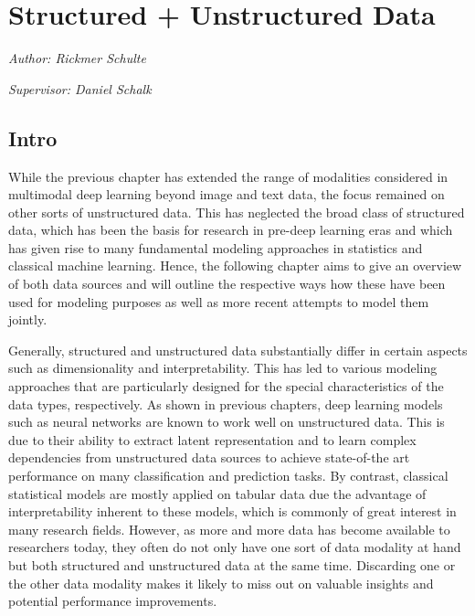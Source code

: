 \documentclass[
]{krantz}
\begin{document}
\hypertarget{c03-02-structured-unstructured}{%
\section{Structured + Unstructured Data}\label{c03-02-structured-unstructured}}

\emph{Author: Rickmer Schulte}

\emph{Supervisor: Daniel Schalk}

\hypertarget{intro-1}{%
\subsection{Intro}\label{intro-1}}

While the previous chapter has extended the range of modalities considered in multimodal deep learning beyond image and text data, the focus remained on other sorts of unstructured data. This has neglected the broad class of structured data, which has been the basis for research in pre-deep learning eras and which has given rise to many fundamental modeling approaches in statistics and classical machine learning. Hence, the following chapter aims to give an overview of both data sources and will outline the respective ways how these have been used for modeling purposes as well as more recent attempts to model them jointly.

Generally, structured and unstructured data substantially differ in certain aspects such as dimensionality and interpretability. This has led to various modeling approaches that are particularly designed for the special characteristics of the data types, respectively. As shown in previous chapters, deep learning models such as neural networks are known to work well on unstructured data. This is due to their ability to extract latent representation and to learn complex dependencies from unstructured data sources to achieve state-of-the art performance on many classification and prediction tasks. By contrast, classical statistical models are mostly applied on tabular data due the advantage of interpretability inherent to these models, which is commonly of great interest in many research fields. However, as more and more data has become available to researchers today, they often do not only have one sort of data modality at hand but both structured and unstructured data at the same time. Discarding one or the other data modality makes it likely to miss out on valuable insights and potential performance improvements.
\end{document}
